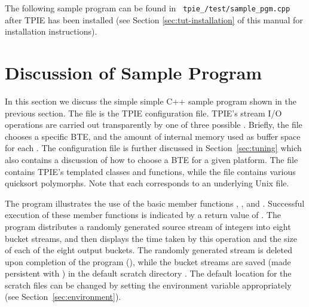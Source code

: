 The following sample program can be found in {\tt
   tpie\_\version/test/sample\_pgm.cpp} after TPIE has been
   installed (see Section \ref{sec:tut-installation} of this manual for installation instructions).



\section{Discussion of Sample Program}

In this section we discuss the simple simple C++ sample
program shown in the previous section. The file
 is the TPIE configuration file. TPIE's
 stream I/O operations are carried out
transparently by one of three possible . Briefly, the file  chooses
a specific BTE, and the amount of internal memory used as
buffer space for each . The
 configuration file is further discussed
in Section~\ref{sec:tuning} which also contains a discussion
of how to choose a BTE for a given platform. The file
 contains TPIE's templated classes and
functions, while the file  contains
various quicksort polymorphs. Note that each
 corresponds to an underlying Unix file.

The program illustrates the use of the basic
 member functions ,
,  and .
Successful execution of these member functions is indicated
by a return value of .  The program
distributes a randomly generated source stream of integers
into eight bucket streams, and then displays the time taken
by this operation and the size of each of the eight output
buckets. The randomly generated stream is deleted upon
completion of the program
(), while the bucket
streams are saved (made persistent with
) in the
default scratch directory . The default
location for the scratch files can be changed by setting the environment variable
 appropriately (see
Section~\ref{sec:environment}).

